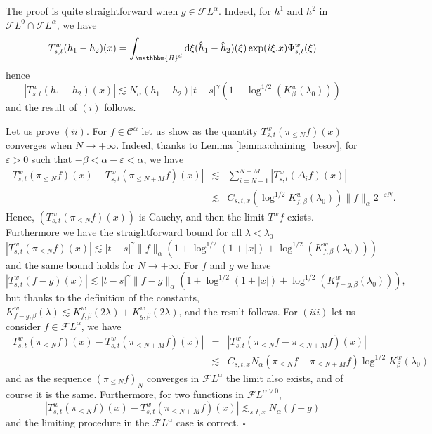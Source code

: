 \documentclass[a4paper,11pt]{article}
\newcommand{\mathd}{\mathrm{d}}
\newcommand{\noplus}{}
\newenvironment{proof}{{\sc Proof.}}{\hfill$\square$}
\newcommand{\CC}{\mathscr C}
\newcommand{\CF}{\mathscr F}
\begin{document}
\begin{proof}
  The proof is quite straightforward when $g \in \CF L^{\alpha}$. Indeed, for
  $h^{1}$ and $h^{2}$ in $\CF L^{0} \cap \CF L^{\alpha}$, we have
  \[ T_{s,t}^{w} ( h_{1} -h_{2} ) ( x ) = \int_{\mathbbm{R}^{d}} \mathd \xi (
     \hat{h}_{1} - \hat{h}_{2} ) ( \xi ) \exp ( i \xi .x ) \Phi_{s,t}^{w} (
     \xi ) \]
  hence
  \[ | T^{w}_{s,t} ( h_{1} -h_{2} ) ( x ) | \lesssim N_{\alpha} ( h_{1}
     -h_{2} ) | t-s |^{\gamma} ( 1+ \log^{1/2} ( K^{w}_{\beta} ( \lambda_{0} )
     ) ) \]
  and the result of $( i )$ follows.
  
  
  
  Let us prove $( i i )$. For $f \in \CC^{\alpha}$ let us show as the quantity
  $T^{w}_{s,t} ( \pi_{\leqslant N} f ) ( x )$ converges when $N \rightarrow +
  \infty$. Indeed, thanks to Lemma \ref{lemma:chaining_besov}, for
  $\varepsilon >0$ such that $- \beta < \alpha - \varepsilon < \alpha$, we
  have
  \begin{eqnarray*}
    | T^{w}_{s,t} ( \pi_{\leqslant N} f ) ( x ) -T^{w}_{s,t} ( \pi_{\leqslant
    N+M} f ) ( x ) | & \lesssim & \sum_{i=N+1}^{N+M} | T^{w}_{s,t} (
    \Delta_{i} f ) ( x ) |\\
    & \lesssim & C_{s,t,x} ( \log^{1/2} K_{f, \beta}^{w} ( \lambda_{0} ) ) \|
    f \|_{\alpha} 2^{- \varepsilon N} .
  \end{eqnarray*}
  Hence, $\left( T^{w}_{s,t} ( \pi_{\leqslant N} f ) ( x ) \right)$ is Cauchy,
  and then the limit $T^{w} f$ exists. Furthermore we have the straightforward
  bound for all $\lambda < \lambda_{0}$
  \[ | T^{w}_{s,t} ( \pi_{\leqslant N} f ) ( x ) | \lesssim | t-s |^{\gamma}
     \| f \|_{\alpha} ( 1+ \log^{1/2} ( 1+ | x | )   \noplus \noplus +
     \log^{1/2} ( K^{w}_{f, \beta} ( \lambda_{0} ) ) ) \]
  and the same bound holds for $N \rightarrow + \infty$.
  For $f$ and $g$ we have
  \[ | T^{w}_{s,t} ( f-g ) ( x ) | \lesssim | t-s |^{\gamma} \| f-g
     \|_{\alpha} ( 1+ \log^{1/2} ( 1+ | x | )   \noplus \noplus + \log^{1/2} (
     K^{w}_{f-g, \beta} ( \lambda_{0} ) ) ) , \]
  but thanks to the definition of the constants, $K^{w}_{f-g, \beta} ( \lambda
  ) \lesssim K^{w}_{f, \beta} ( 2 \lambda ) +K^{w}_{g, \beta} ( 2 \lambda )$,
  and the result follows.
  For $( i i i )$ let us consider $f \in \CF L^{\alpha}$, we have
  \begin{eqnarray*}
    | T^{w}_{s,t} ( \pi_{\leqslant N} f ) ( x ) -T^{w}_{s,t} ( \pi_{\leqslant
    N+M} f ) ( x ) | & = & | T^{w}_{s,t} ( \pi_{\leqslant N} f- \pi_{\leqslant
    N+M} f ) ( x ) |\\
    & \lesssim & C_{s,t,x} N_{\alpha} ( \pi_{\leqslant N} f- \pi_{\leqslant
    N+M} f )   \log^{1/2} K_{\beta}^{w} ( \lambda_{0} )
  \end{eqnarray*}
  and as the sequence $( \pi_{\leqslant N} f )_{N}$ converges in $\CF
  L^{\alpha}$ the limit also exists, and of course it is the same.
  Furthermore, for two functions in $\CF L^{\alpha \vee 0}$,
  \[ | T^{w}_{s,t} ( \pi_{\leqslant N} f ) ( x ) -T^{w}_{s,t} (
     \pi_{\leqslant N+M} f ) ( x ) | \lesssim_{s,t,x} N_{\alpha} ( f-g ) \]
  and the limiting procedure in the $\CF L^{\alpha}$ case is correct.
\end{proof}
\end{document}
